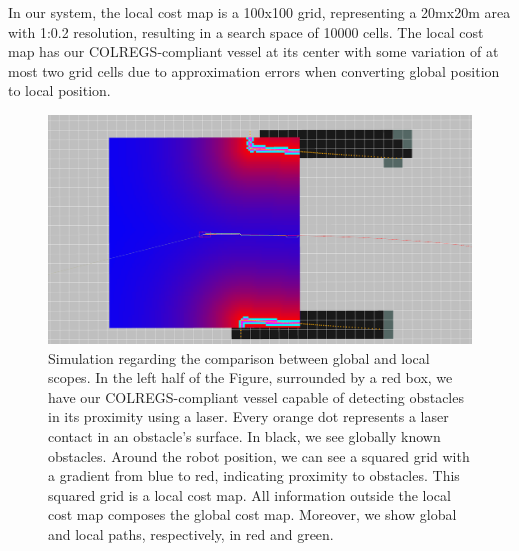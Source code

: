         In our system, the local cost map is a 100x100 grid, representing a 20mx20m area with 1:0.2 resolution, resulting in a search space of 10000 cells. The local cost map has our \ac{COLREGS}-compliant vessel at its center with some variation of at most two grid cells due to approximation errors when converting global position to local position.
        
         \begin{figure}[H]
            \centering
            \includegraphics[scale=0.35]{figs/Chap4/reduced_localCostMap2.png}
            \caption{Simulation regarding the comparison between global and local scopes. In the left half of the Figure, surrounded by a red box, we have our \ac{COLREGS}-compliant vessel capable of detecting obstacles in its proximity using a laser. Every orange dot represents a laser contact in an obstacle's surface. In black, we see globally known obstacles.  Around the robot position, we can see a squared grid with a gradient from blue to red, indicating proximity to obstacles. This squared grid is a local cost map. All information outside the local cost map composes the global cost map. Moreover, we show global and local paths, respectively, in red and green.}
            \label{fig:costmaps}
        \end{figure}

